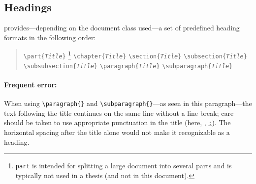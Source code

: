 \subsection{Headings}
\label{sec:headings}

\latex provides---depending on the document class used---a set of predefined
heading formats in the following order:
%
\begin{quote}
    \verb!\part{!\texttt{\em Title}\verb!}!%
    \footnote{\texttt{part} is intended for splitting a large document
    into several parts and is typically not used in a thesis (and not in this
    document).}
    \newline%
    \verb!\chapter{!\texttt{\em Title}\verb!}! \newline%
    \verb!\section{!\texttt{\em Title}\verb!}! \newline%
    \verb!\subsection{!\texttt{\em Title}\verb!}! \newline%
    \verb!\subsubsection{!\texttt{\em Title}\verb!}! \newline%
    \verb!\paragraph{!\texttt{\em Title}\verb!}! \newline%
    \verb!\subparagraph{!\texttt{\em Title}\verb!}!
\end{quote}
%
\paragraph{Frequent error:} When using \verb!\paragraph{}! and
\verb!\subparagraph{}!---as seen in this paragraph---the text following the
title continues on the same line without a line break; care should be taken to
use appropriate punctuation in the title (here, \eg, \underline{\texttt{:}}).
The horizontal spacing after the title alone would not make it recognizable as a
heading.

